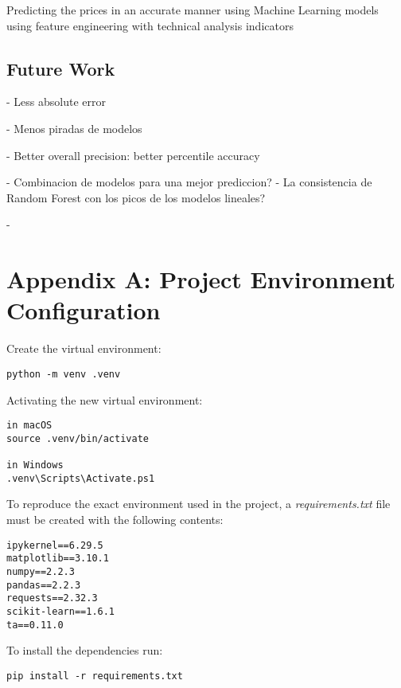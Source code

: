 \documentclass[12pt]{report} %
\begin{document}
Predicting the prices in an accurate manner using Machine Learning models using feature engineering with technical analysis indicators


\section{Future Work}
- Less absolute error

- Menos piradas de modelos

- Better overall precision: better percentile accuracy

- Combinacion de modelos para una mejor prediccion? - La consistencia de Random Forest con los picos de los modelos lineales?

- 




\clearpage
{}

\printbibliography



\appendix



\chapter* {Appendix A: Project Environment Configuration}
\label{app:appendix_a_env_setup}

\noindent Create the virtual environment:
\begin{verbatim}
python -m venv .venv
\end{verbatim}

\noindent Activating the new virtual environment:
\begin{verbatim}
in macOS
source .venv/bin/activate

in Windows
.venv\Scripts\Activate.ps1
\end{verbatim}

\noindent To reproduce the exact environment used in the project, a \textit{requirements.txt} file must be created with the following contents:
\begin{verbatim}
ipykernel==6.29.5
matplotlib==3.10.1
numpy==2.2.3
pandas==2.2.3
requests==2.32.3
scikit-learn==1.6.1
ta==0.11.0
\end{verbatim}

\noindent To install the dependencies run:
\begin{verbatim}
pip install -r requirements.txt 
\end{verbatim}
\end{document}
